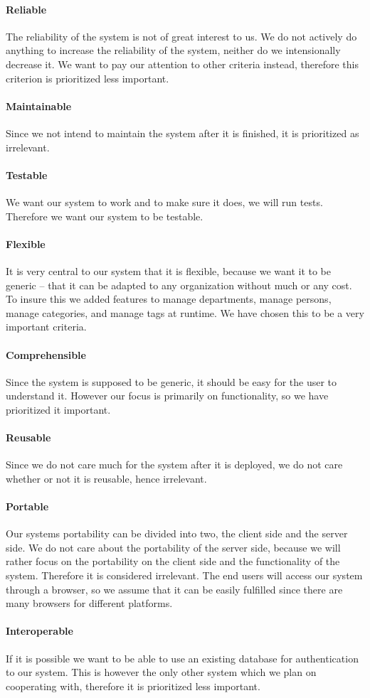 \paragraph{Reliable}
The reliability of the \hdesk[] system is not of great interest to us.
We do not actively do anything to increase the reliability of the system, neither do we intensionally decrease it.
We want to pay our attention to other criteria instead, therefore this criterion is prioritized less important.
\paragraph{Maintainable}
Since we not intend to maintain the system after it is finished, it is prioritized as irrelevant.
\paragraph{Testable}
We want our system to work and to make sure it does, we will run tests.
Therefore we want our system to be testable.
\paragraph{Flexible}
It is very central to our system that it is flexible, because we want it to be generic -- that it can be adapted to any organization without much or any cost. To insure this we added features to manage departments, manage persons, manage categories, and manage tags at runtime. We have chosen this to be a very important criteria.
\paragraph{Comprehensible}
Since the \hdesk[] system is supposed to be generic, it should be easy for the user to understand it.
However our focus is primarily on functionality, so we have prioritized it important.
\paragraph{Reusable}
Since we do not care much for the system after it is deployed, we do not care whether or not it is reusable, hence irrelevant.
\paragraph{Portable}
Our systems portability can be divided into two, the client side and the server side.
We do not care about the portability of the server side, because we will rather focus on the portability on the client side and the functionality of the system.
Therefore it is considered irrelevant.
The end users will access our system through a browser, so we assume that it can be easily fulfilled since there are many browsers for different platforms. \cite{chrome10}\cite{firefox}
\paragraph{Interoperable}
If it is possible we want to be able to use an existing database for authentication to our system.
This is however the only other system which we plan on cooperating with, therefore it is prioritized less important.